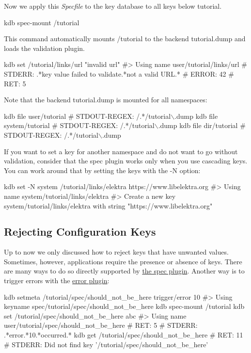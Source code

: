 Now we apply this {\itshape Specfile} to the key database to all keys below {\ttfamily tutorial}. 
\begin{DoxyCode}
kdb spec-mount /tutorial
\end{DoxyCode}
 This command automatically mounts {\ttfamily /tutorial} to the backend {\ttfamily tutorial.\+dump} and loads the validation plugin.


\begin{DoxyCode}
kdb set /tutorial/links/url "invalid url"
#> Using name user/tutorial/links/url
# STDERR: .*key value failed to validate.*not a valid URL.*
# ERROR:  42
# RET:    5
\end{DoxyCode}


Note that the backend {\ttfamily tutorial.\+dump} is mounted for all namespaces\+: 
\begin{DoxyCode}
kdb file user/tutorial
# STDOUT-REGEX: /.*/tutorial\(\backslash\).dump
kdb file system/tutorial
# STDOUT-REGEX: /.*/tutorial\(\backslash\).dump
kdb file dir/tutorial
# STDOUT-REGEX: /.*/tutorial\(\backslash\).dump
\end{DoxyCode}


If you want to set a key for another namespace and do not want to go without validation, consider that the spec plugin works only when you use cascading keys. You can work around that by setting the keys with the {\ttfamily -\/N} option\+: 
\begin{DoxyCode}
kdb set -N system /tutorial/links/elektra https://www.libelektra.org
#> Using name system/tutorial/links/elektra
#> Create a new key system/tutorial/links/elektra with string "https://www.libelektra.org"
\end{DoxyCode}


\subsection*{Rejecting Configuration Keys}

Up to now we only discussed how to reject keys that have unwanted values. Sometimes, however, applications require the presence or absence of keys. There are many ways to do so directly supported by \hyperlink{md_src_plugins_spec_README_src_plugins_spec_README_md}{the spec plugin}. Another way is to trigger errors with the \hyperlink{md_src_plugins_error_README_src_plugins_error_README_md}{error plugin}\+:


\begin{DoxyCode}
kdb setmeta /tutorial/spec/should\_not\_be\_here trigger/error 10
#> Using keyname spec/tutorial/spec/should\_not\_be\_here
kdb spec-mount /tutorial
kdb set /tutorial/spec/should\_not\_be\_here abc
#> Using name user/tutorial/spec/should\_not\_be\_here
# RET:    5
# STDERR: .*error.*10.*occurred.*
kdb get /tutorial/spec/should\_not\_be\_here
# RET: 11
# STDERR: Did not find key '/tutorial/spec/should\_not\_be\_here'
\end{DoxyCode}


